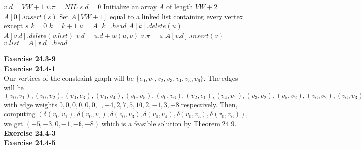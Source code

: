 \documentclass{article}
\begin{document}
\begin{algorithm}
\caption{MODIFIED-DIJKSTRA(G,w,s)}
\begin{algorithmic}[1]
	$v.d = VW + 1$
	$v.\pi = NIL$
\EndFor
\State $s.d = 0$
\State Initialize an array $A$ of length $VW + 2$
\State $A[0].insert(s)$
\State Set $A[VW + 1]$ equal to a linked list containing every vertex except $s$
\State $k = 0$
			\State $k = k + 1$
		\EndWhile
	\State $u = A[k].head$
	\State $A[k].delete(u)$
			\State $A[v.d].delete(v.list)$
			\State $v.d = u.d + w(u,v)$
			\State $v.\pi = u$
			\State $A[v.d].insert(v)$	
			\State $v.list = A[v.d].head$
		\EndIf
	\EndFor
\EndFor
\end{algorithmic}
\end{algorithm}


\noindent\textbf{Exercise 24.3-9}\\





\noindent\textbf{Exercise 24.4-1}\\

Our vertices of the constraint graph will be $\{v_0,v_1,v_2,v_3,v_4,v_5,v_6\}$. The edges will be $(v_0,v_1),(v_0,v_2),(v_0,v_3),(v_0,v_4),(v_0,v_5),(v_0,v_6),(v_2,v_1),(v_4,v_1),(v_3,v_2),(v_5,v_2),(v_6,v_2),(v_6,v_3),(v_2,v_4),(v_1,v_5),(v_4,v_5),(v_3,v_6)$ with edge weights $0,0,0,0,0,0,1,-4,2,7,5,10,2,-1,3,-8$ respectively. Then, computing $(\delta(v_0,v_1),\delta(v_0,v_2),\delta(v_0,v_3),\delta(v_0,v_4),\delta(v_0,v_5),\delta(v_0,v_6))$, we get $(-5,-3,0,-1,-6,-8)$ which is a feasible solution by Theorem 24.9.\\



\noindent\textbf{Exercise 24.4-3}\\




\noindent\textbf{Exercise 24.4-5}\\
\end{document}
